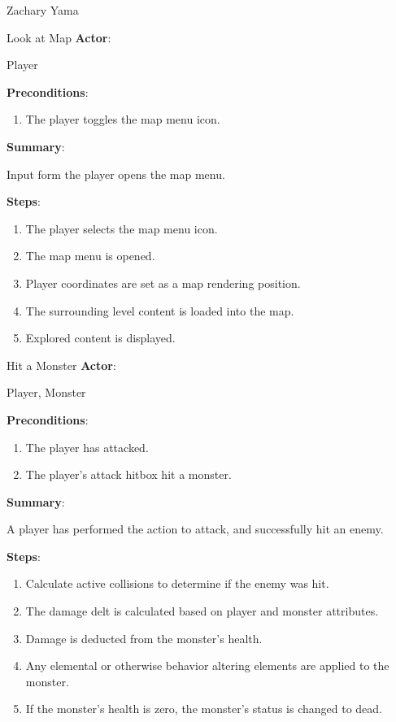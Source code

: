 \documentclass[12pt]{report}
\begin{document}
\begin{section}{Zachary Yama}
\begin{subsection}{Look at Map}
\textbf{Actor}:

Player

\textbf{Preconditions}:

\begin{enumerate}
\item The player toggles the map menu icon.
\end{enumerate}

\textbf{Summary}:

Input form the player opens the map menu.

\textbf{Steps}:

\begin{enumerate}
\item The player selects the map menu icon.
\item The map menu is opened.
\item Player coordinates are set as a map rendering position.
\item The surrounding level content is loaded into the map.
\item Explored content is displayed.
\end{enumerate}
\end{subsection}

\begin{subsection}{Hit a Monster}
\textbf{Actor}:

Player, Monster

\textbf{Preconditions}:

\begin{enumerate}
\item The player has attacked.
\item The player's attack hitbox hit a monster.
\end{enumerate}

\textbf{Summary}:

A player has performed the action to attack, and successfully hit
an enemy.

\textbf{Steps}:

\begin{enumerate}
\item Calculate active collisions to determine if the enemy was hit.
\item The damage delt is calculated based on player and monster attributes.
\item Damage is deducted from the monster's health. 
\item Any elemental or otherwise behavior altering elements are applied to
the monster.
\item  If the monster's health is zero, the monster's status is changed to
dead.
\end{enumerate}
\end{subsection}


\end{section}
\end{document}
